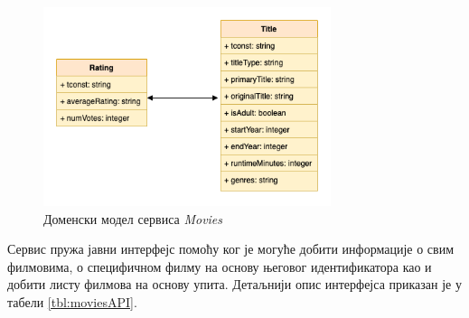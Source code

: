 \documentclass[12pt,oneside]{memoir}
\begin{document}
\begin{figure}[!ht]
  \centering
  \includegraphics[width=0.75\textwidth]{matfmaster/img/moviesShema.png}
  \caption{Доменски модел сервиса \textit{Movies}}
  \label{fig:moviesShema}
\end{figure}
Сервис пружа јавни интерфејс помоћу ког је могуће добити информације о свим филмовима, о специфичном филму на основу његовог идентификатора као и добити листу филмова на основу упита. Детаљнији опис интерфејса приказан је у табели \ref{tbl:moviesAPI}.
\newpage
\end{document}

